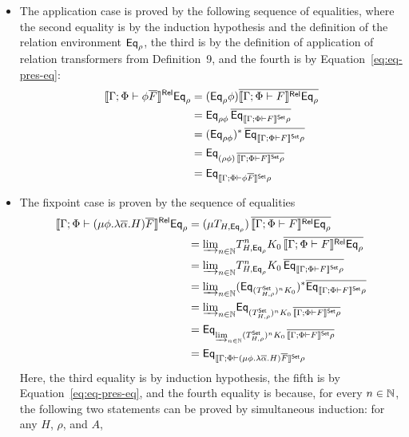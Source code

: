 \documentclass{lmcs}
\theoremstyle{plain}\newtheorem{satz}[thm]{Satz}
\newcommand{\set}{\mathsf{Set}}
\begin{document}
{\begin{itemize}
\item The application case is proved by the following sequence of
  equalities, where the second equality is by the induction hypothesis
  and the definition of the relation environment $\mathsf{Eq}_\rho$, the third
  is by the definition of application of relation transformers from
  Definition~9, and the fourth is by Equation~\ref{eq:eq-pres-eq}:
\[
\begin{split}
\relsem{\Gamma; \Phi \vdash \phi\ol{F}}\Eq_{\rho} &=
(\Eq_{\rho}\phi)\ol{\relsem{\Gamma; \Phi \vdash F}
\Eq_{\rho}}\\
&= \Eq_{\rho \phi}\, \ol{\Eq_{\setsem{\Gamma; \Phi \vdash F}
  \rho}}\\
&= (\Eq_{\rho \phi})^* \,\ol{\Eq_{\setsem{\Gamma; \Phi \vdash F}
  \rho}}\\
&= \Eq_{(\rho \phi) \,\ol{\setsem{\Gamma; \Phi \vdash F} \rho}}\\
&= \Eq_{\setsem{\Gamma; \Phi \vdash \phi\ol{F}}\rho}
\end{split}
\]
\item  The fixpoint case is proven by the sequence of equalities
\[
\begin{split}
\relsem{\Gamma; \Phi \vdash (\mu \phi.\lambda
  \ol{\alpha}. H)\ol{F}}\Eq_{\rho} 
&=(\mu {T_{H, \Eq_{\rho}}}) \,\ol{\relsem{\Gamma; \Phi \vdash F}\Eq_{\rho}}\\ 
&= \colim{n \in \nat}{T^n_{H, \Eq_{\rho}} K_0}\, \ol{\relsem{\Gamma; \Phi 
  \vdash F}\Eq_{\rho}}\\
&= \colim{n \in \nat}{ T^n_{H, \Eq_{\rho}} K_0 \,\ol{\Eq_{\setsem{\Gamma;
    \Phi \vdash F}\rho}}}\\
&= \colim{n \in \nat}{(\Eq_{(T^\set_{H,\rho})^n K_0})^*
  \ol{\Eq_{\setsem{\Gamma; \Phi \vdash F}\rho}}}\\
&= \colim{n \in \nat}{\Eq_{(T^\set_{H,\rho})^n K_0 \,\ol{\setsem{\Gamma;
        \Phi \vdash F}\rho}}}\\ 
&= \Eq_{\colim{n \in \nat}{ (T^\set_{H,\rho})^n K_0\,
    \ol{\setsem{\Gamma; \Phi \vdash F}\rho}}}\\
&= \Eq_{\setsem{\Gamma; \Phi \vdash (\mu \phi.\lambda
      \ol{\alpha}. H)\ol{F}}\rho}
\end{split}
\]
Here, the third equality is by induction hypothesis, the fifth is by
Equation~\ref{eq:eq-pres-eq}, and the fourth equality is because, for
every $n \in \mathbb{N}$, the following two statements can be proved by
simultaneous induction: for any $H$, $\rho$, and $A$, 
\begin{equation}\label{eq:iel-fix-point-intermediate1}

\end{equation}
\end{itemize}}
\end{document}
